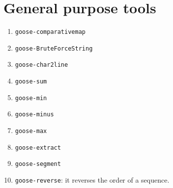 \chapter{General purpose tools}
\label{seq}

\begin{enumerate}
\item \texttt{goose-comparativemap}%
\item \texttt{goose-BruteForceString}%
\item \texttt{goose-char2line}%
\item \texttt{goose-sum}%
\item \texttt{goose-min}%
\item \texttt{goose-minus}%
\item \texttt{goose-max}%
\item \texttt{goose-extract}%
\item \texttt{goose-segment}%
\item \texttt{goose-reverse}: it reverses the order of a sequence.
\end{enumerate}

%
%
%
%
%
%
%
%
%
